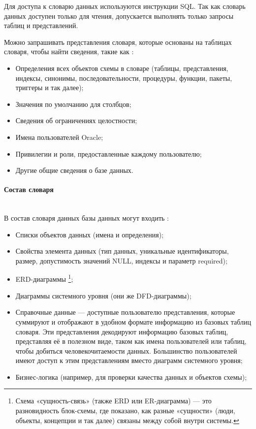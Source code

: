 Для доступа к словарю данных используются инструкции SQL. Так как словарь данных доступен только для чтения, допускается выполнять только запросы таблиц и представлений.

Можно запрашивать представления словаря, которые основаны на таблицах словаря, чтобы найти сведения, такие как \autocite{SqlOracle}:
\begin{itemize}
    \item Определения всех объектов схемы в словаре (таблицы, представления, индексы, синонимы, последовательности, процедуры, функции, пакеты, триггеры и так далее);
    \item Значения по умолчанию для столбцов;
    \item Сведения об ограничениях целостности;
    \item Имена пользователей Oracle;
    \item Привилегии и роли, предоставленные каждому пользователю;
    \item Другие общие сведения о базе данных.
\end{itemize}

\paragraph{Состав словаря} ~\\

В состав словаря данных базы данных могут входить \autocite{DataDictionary}:

\begin{itemize}
    \item Списки объектов данных (имена и определения);
    \item Свойства элемента данных (тип данных, уникальные идентификаторы, размер, допустимость значений NULL, индексы и параметр required);
    \item ERD-диаграммы 
        \footnote{Схема «сущность-связь» (также ERD или ER-диаграмма) — это разновидность блок-схемы, где показано, как разные «сущности» (люди, объекты, концепции и так далее) связаны между собой внутри системы.};
    \item Диаграммы системного уровня (они же DFD-диаграммы);
    \item Справочные данные — доступные пользователю представления, которые суммируют и отображают в удобном формате информацию из базовых таблиц словаря. Эти представления декодируют информацию базовых таблиц, представляя её в полезном виде, таком как имена пользователей или таблиц, чтобы добиться человекочитаемости данных. Большинство пользователей имеют доступ к этим представлениям вместо диаграмм системного уровня;
    \item Бизнес-логика (например, для проверки качества данных и объектов схемы);
\end{itemize}

